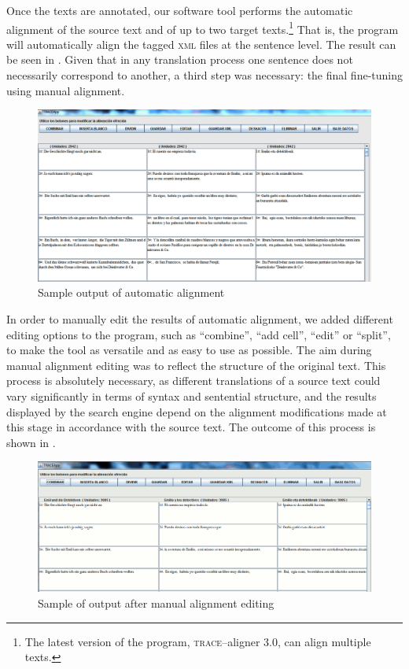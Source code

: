 \documentclass[output=paper]{LSP/langsci}
\begin{document}
Once the texts are annotated, our software tool performs the automatic alignment of the source text and of up to two target texts.\footnote{The latest version of the program, \textsc{trace}--aligner 3.0, can align multiple texts.}  That is, the program will automatically align the tagged \textsc{xml} files at the sentence level. The result can be seen in . Given that in any translation process one sentence does not necessarily correspond to another, a third step was necessary: the final fine-tuning using manual alignment.

\begin{figure}[htp] 
\includegraphics[width=1.0\textwidth]{./figures/6-3.png}
\caption{Sample output of automatic alignment} \label{fig:3:3}
\end{figure}

In order to manually edit the results of automatic alignment, we added different editing options to the program, such as “combine”, “add cell”, “edit” or “split”, to make the tool as versatile and as easy to use as possible. The aim during manual alignment editing was to reflect the structure of the original text. This process is absolutely necessary, as different translations of a source text could vary significantly in terms of syntax and sentential structure, and the results displayed by the search engine depend on the alignment modifications made at this stage in accordance with the source text. The outcome of this process is shown in .

\begin{figure}
\includegraphics[width=1.0\textwidth]{./figures/6-4.png}
\caption{Sample of output after manual alignment editing} \label{fig:3:4}
\end{figure}
\end{document}
